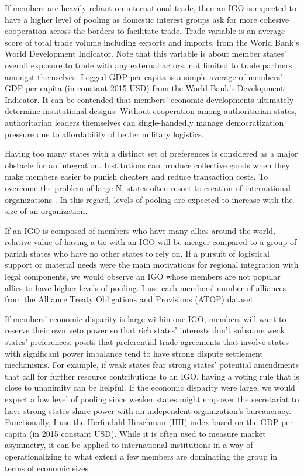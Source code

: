 \documentclass[12pt]{article}
\begin{document}
If members are heavily reliant on international trade, then an IGO is expected to have a higher level of pooling as domestic interest groups ask for more cohesive cooperation across the borders to facilitate trade. Trade variable is an average score of total trade volume including exports and imports, from the World Bank's World Development Indicator. Note that this variable is about member states' overall exposure to trade with any external actors, not limited to trade partners amongst themselves. Logged GDP per capita is a simple average of members' GDP per capita (in constant 2015 USD) from the World Bank's Development Indicator. It can be contended that members' economic developments ultimately determine institutional designs. Without cooperation among authoritarian states, authoritarian leaders themselves can single-handedly manage democratization pressure due to affordability of better military logistics.


Having too many states with a distinct set of preferences is considered as a major obstacle for an integration. Institutions can produce collective goods when they make members easier to punish cheaters and reduce transaction costs. To overcome the problem of large N, states often resort to creation of international organizations \parencite{guzman_how_2008, abbott_why_1998}. In this regard, levels of pooling are expected to increase with the size of an organization.


If an IGO is composed of members who have many allies around the world, relative value of having a tie with an IGO will be meager compared to a group of pariah states who have no other states to rely on. If a pursuit of logistical support or material needs were the main motivations for regional integration with legal components, we would observe an IGO whose members are not popular allies to have higher levels of pooling. I use each members' number of alliances from the Alliance Treaty Obligations and Provisions (ATOP) dataset \parencite{leeds_alliance_2003}.


If members' economic disparity is large within one IGO, members will want to reserve their own veto power so that rich states' interests don't subsume weak states' preferences. \textcite{allee_delegating_2010} posits that preferential trade agreements that involve states with significant power imbalance tend to have strong dispute settlement mechanisms. For example, if weak states fear strong states' potential amendments that call for further resource contributions to an IGO, having a voting rule that is close to unanimity can be helpful. If the economic disparity were large, we would expect a low level of pooling since weaker states might empower the secretariat to have strong states share power with an independent organization's bureaucracy. Functionally, I use the Herfindahl-Hirschman (HH) index based on the GDP per capita (in 2015 constant USD). While it is often used to measure market asymmetry, it can be applied to international institutions in a way of operationalizing to what extent a few members are dominating the group in terms of economic sizes \parencite{smith_politics_2000}.
\end{document}
